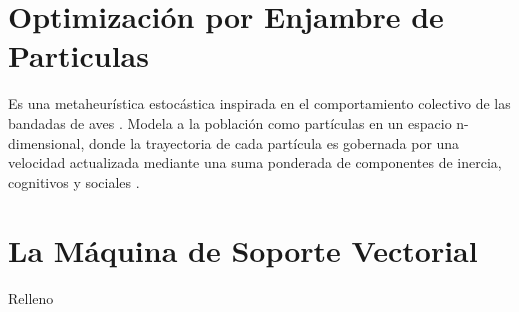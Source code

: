 \section{Optimización por Enjambre de Particulas}
Es una metaheurística estocástica inspirada en el comportamiento colectivo de las bandadas de aves \cite{eiben_introduction_2015}. Modela a la población como partículas en un espacio n-dimensional, donde la trayectoria de cada partícula es gobernada por una velocidad actualizada mediante una suma ponderada de componentes de inercia, cognitivos y sociales \cite{eiben_introduction_2015, ratnaweera_self-organizing_2004}.

\section{La Máquina de Soporte Vectorial}
Relleno
